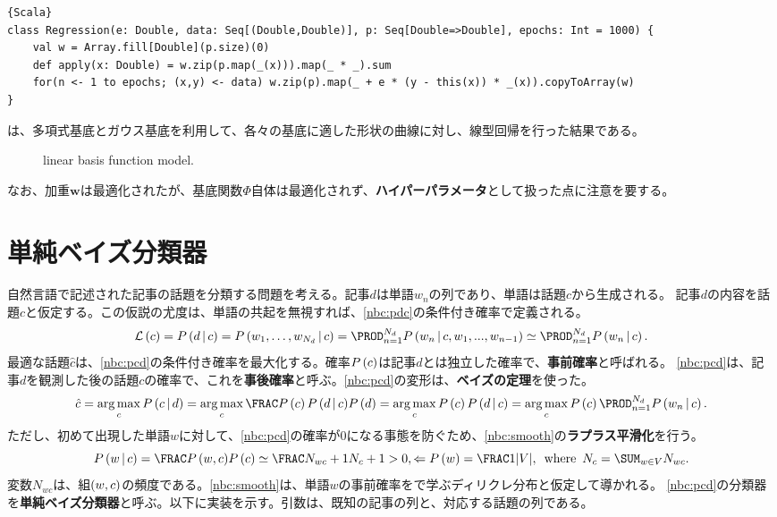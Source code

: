 \documentclass[10pt,a4paper]{book}
\begin{document}
\begin{Verbatim}{Scala}
class Regression(e: Double, data: Seq[(Double,Double)], p: Seq[Double=>Double], epochs: Int = 1000) {
	val w = Array.fill[Double](p.size)(0)
	def apply(x: Double) = w.zip(p.map(_(x))).map(_ * _).sum
	for(n <- 1 to epochs; (x,y) <- data) w.zip(p).map(_ + e * (y - this(x)) * _(x)).copyToArray(w)
}
\end{Verbatim}

は、多項式基底とガウス基底を利用して、各々の基底に適した形状の曲線に対し、線型回帰を行った結果である。

\begin{figure}[h]
\centering
{}
\caption{linear basis function model.\label{fig:lbf}}
\end{figure}

なお、加重$\bm{w}$は最適化されたが、基底関数$\Phi$自体は最適化されず、\textbf{ハイパーパラメータ}として扱った点に注意を要する。

\section{単純ベイズ分類器}

自然言語で記述された記事の話題を分類する問題を考える。記事$d$は単語$w_n$の列であり、単語は話題$c$から生成される。
記事$d$の内容を話題$c$と仮定する。この仮説の尤度は、単語の共起を無視すれば、\eqref{nbc:pdc}の条件付き確率で定義される。
%
\begin{equation}
\label{eq:nbc:pdc}
\Lk{c} =
\Prob{d}[c] =
\Prob{w_1,\dots,w_{N_d}}[c] =
\prod_{n=1}^{N_d} \Prob{w_n}[c,w_1,...,w_{n-1}] \simeq
\prod_{n=1}^{N_d} \Prob{w_n}[c].
\end{equation}
%
最適な話題$\hat{c}$は、\eqref{nbc:pcd}の条件付き確率を最大化する。確率$\Prob{c}$は記事$d$とは独立した確率で、\textbf{事前確率}と呼ばれる。
\eqref{nbc:pcd}は、記事$d$を観測した後の話題$c$の確率で、これを\textbf{事後確率}と呼ぶ。\eqref{nbc:pcd}の変形は、\textbf{ベイズの定理}を使った。
%
\begin{equation}
\label{eq:nbc:pcd}
\hat{c} =
\argmax_c \Prob{c}[d] =
\argmax_c \frac{\Prob{c}\Prob{d}[c]}{\Prob{d}} =
\argmax_c \Prob{c}\Prob{d}[c] =
\argmax_c \Prob{c} \prod_{n=1}^{N_d} \Prob{w_n}[c].
\end{equation}
%
ただし、初めて出現した単語$w$に対して、\eqref{nbc:pcd}の確率が$0$になる事態を防ぐため、\eqref{nbc:smooth}の\textbf{ラプラス平滑化}を行う。
%
\begin{equation}
\label{eq:nbc:smooth}
\Prob{w}[c] =
\frac{\Prob{w,c}}{\Prob{c}} \simeq
\frac{N_{wc}+1}{N_c+1} > 0,
\Leftarrow
\Prob{w} = \frac{1}{\abs{V}},
\where
N_c = \sum_{w \in V} N_{wc}.
\end{equation}
%
変数$N_{wc}$は、組$\pair{w}{c}$の頻度である。\eqref{nbc:smooth}は、単語$w$の事前確率をで学ぶディリクレ分布と仮定して導かれる。
\eqref{nbc:pcd}の分類器を\textbf{単純ベイズ分類器}と呼ぶ。以下に実装を示す。引数は、既知の記事の列と、対応する話題の列である。
\end{document}
